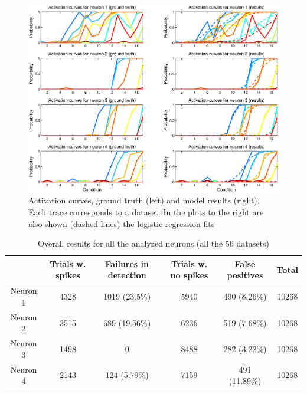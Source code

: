 \documentclass[12pt,letterpaper,fleqn]{article}
\begin{document}
\begin{figure}[h!]
          \centering
                \includegraphics[width=1\textwidth]{Results10datasets.eps} 
                \caption{Activation curves, ground truth (left) and model results (right). Each trace corresponds to a dataset. In the  plots  to the right are also shown (dashed lines) the logistic regression fits}\end{figure}

\begin{table}[h!]
\begin{tabular}{|c|c|c|c|c|c|}
\hline
   &  Trials w. spikes & Failures in detection & Trials w. no spikes & False positives  & Total \\ \hline
   Neuron 1 & 4328 & 1019 (23.5\%) & 5940 & 490 (8.26\%) & 10268 \\ \hline
   Neuron 2 & 3515 & 689 (19.56\%) & 6236 & 519 (7.68\%)  & 10268\\ \hline
   Neuron 3 & 1498 & 0 & 8488 & 282 (3.22\%)& 10268  \\ \hline
   Neuron 4 & 2143 & 124 (5.79\%) & 7159 & 491 (11.89\%) & 10268  \\
  \hline
\end{tabular}
\caption{Overall results for all the analyzed neurons (all the 56 datasets)}
\end{table}
\end{document}
